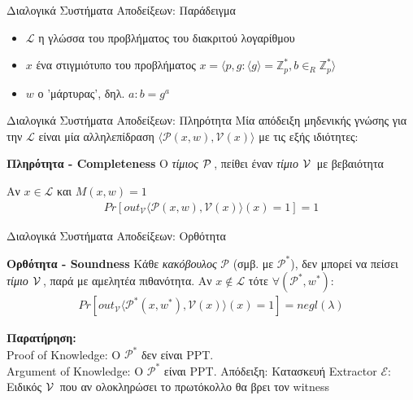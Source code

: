 \documentclass[10pt,handout]{beamer}
\begin{document}
\begin{frame}{Διαλογικά Συστήματα Αποδείξεων: Παράδειγμα}
\begin{itemize}
\item $\mathcal{L}$ η γλώσσα του προβλήματος του διακριτού λογαρίθμου \pause
\item $x$ ένα στιγμιότυπο του προβλήματος $x=\langle p,g: \langle g \rangle = \mathbb{Z}_p^*, b  \in_R \mathbb{Z}_p^* \rangle$ \pause
\item $w$ ο 'μάρτυρας', δηλ. $a: b = g^a$
\end{itemize}
\end{frame}


\begin{frame}{Διαλογικά Συστήματα Αποδείξεων: Πληρότητα}
Μία απόδειξη μηδενικής γνώσης για την $ \mathcal{L} $ είναι μία αλληλεπίδραση $\langle\mathcal{P}(x,w), \mathcal{V}(x) \rangle$ με τις εξής ιδιότητες: \pause

\begin{block}{\textbf{Πληρότητα - Completeness}}  
Ο \emph{τίμιος} $\mathcal{P}\,$, πείθει έναν \emph{τίμιο} $\mathcal{V}\,$ με  βεβαιότητα \pause

Αν  $x \in \mathcal{L}$ και $M(x,w) = 1$
\begin{align*}
Pr[out_{\mathcal{V}} \langle \mathcal{P}(x,w), \mathcal{V}(x) \rangle (x)=1] = 1  
\end{align*}
\end{block} 
\end{frame}

\begin{frame}{Διαλογικά Συστήματα Αποδείξεων: Ορθότητα}
\begin{block}{\textbf{Ορθότητα - Soundness}}
Κάθε \emph{κακόβουλος} $\mathcal{P}$ (σμβ. με $\mathcal{P}^*$), δεν μπορεί να πείσει \emph{τίμιο} $\mathcal{V}\,$, παρά με αμελητέα πιθανότητα.
\pause
Αν $x \notin \mathcal{L}$ τότε $\forall (\mathcal{P}^*,w^*)$: 
\pause
\begin{align*}
Pr[out_{\mathcal{V}} \langle \mathcal{P}^*(x,w^*), \mathcal{V}(x) \rangle (x)=1] = negl(\lambda)
\end{align*} 
\end{block}
\pause
\textbf{Παρατήρηση: }\\
Proof of Knowledge: O $\mathcal{P}^*$ \alert{δεν} είναι PPT. \\
Argument of Knowledge: O $\mathcal{P}^*$  είναι PPT.
Απόδειξη: Κατασκευή Extractor $\mathcal{E}$: Ειδικός $\mathcal{V}\,$ που αν ολοκληρώσει το πρωτόκολλο θα βρει τον witness
\end{frame}
\end{document}
